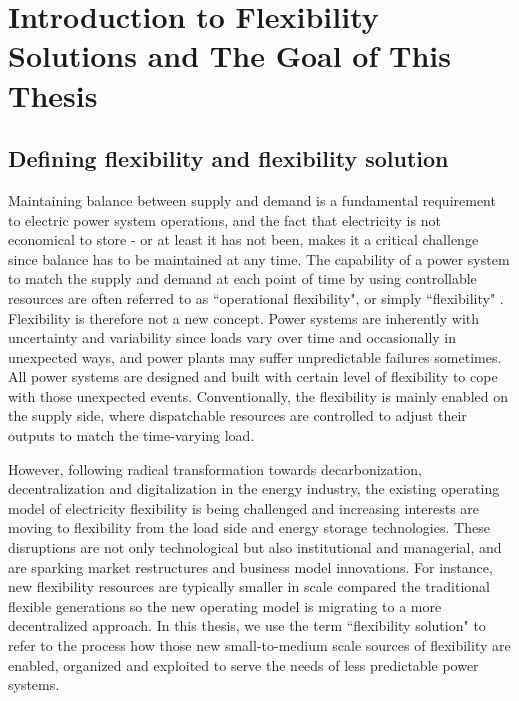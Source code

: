 \chapter{Introduction to Flexibility Solutions and The Goal of This Thesis}
\label{ch:introduction}

\section{Defining flexibility and flexibility solution}
Maintaining balance between supply and demand is a fundamental requirement to electric power system operations, and the fact that electricity is not economical to store - or at least it has not been, makes it a critical challenge since balance has to be maintained at any time. The capability of a power system to match the supply and demand at each point of time by using controllable resources are often referred to as ``operational flexibility", or simply ``flexibility" \cite{Cochran2014,Wang2017,Lund2015,Delft}. Flexibility is therefore not a new concept. Power systems are inherently with uncertainty and variability since loads vary over time and occasionally in unexpected ways, and power plants may suffer unpredictable failures sometimes. All power systems are designed and built with certain level of flexibility to cope with those unexpected events. Conventionally, the flexibility is mainly enabled on the supply side, where dispatchable resources are controlled to adjust their outputs to match the time-varying load.

However, following radical transformation towards decarbonization, decentralization and digitalization in the energy industry, the existing operating model of electricity flexibility is being challenged and increasing interests are moving to flexibility from the load side and energy storage technologies\cite{Lund2015,Bronski2015,McKinsey&Company2010}. These disruptions are not only technological but also institutional and managerial, and are sparking market restructures and business model innovations. For instance, new flexibility resources are typically smaller in scale compared the traditional flexible generations so the new operating model is migrating to a more decentralized approach. In this thesis, we use the term ``flexibility solution" to refer to the process how those new small-to-medium scale sources of flexibility are enabled, organized and exploited to serve the needs of less predictable power systems.


